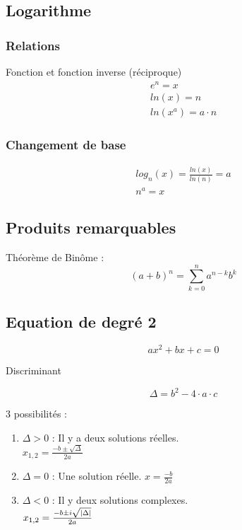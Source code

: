 \subsection{Logarithme}
\subsubsection{Relations}
Fonction et fonction inverse (réciproque)
\begin{eqnarray}
e^n=x\\
ln(x)=n\\
ln(x^a)=a\cdot n
\end{eqnarray}

\subsubsection{Changement de base}
\begin{eqnarray}
log_{n}(x)=\frac{ln(x)}{ln(n)}=a\\
n^a=x
\end{eqnarray}

\subsection{Produits remarquables}
Théorème de Binôme : 
\begin{equation}
(a+b)^n=\sum_{k=0}^{n}a^{n-k}b^k
\end{equation}
\subsection{Equation de degré 2}
\begin{equation}
a x^2+ bx +c =0
\end{equation}

Discriminant

\begin{equation}
\Delta = b^2-4\cdot a \cdot c
\end{equation}

3 possibilités : 

\begin{enumerate}
	\item $\Delta > 0 $ :  Il y a deux solutions réelles.\\ $x_{1,2}=\frac{-b \pm \sqrt{\Delta}}{2 a}$
	\item $\Delta = 0 $ : Une solution réelle.
	$x=\frac{-b}{2 a}$
	\item $\Delta < 0 $ : Il y deux solutions complexes.\\
	$x_{1,2}=\frac{-b\pm i \sqrt{\lvert\Delta\rvert}}{2 a}$
\end{enumerate}
